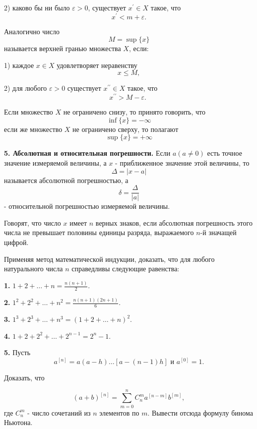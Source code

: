 \documentclass[12pt]{book}
\begin{document}
2) каково бы ни было $\varepsilon>0$, существует $x^{\prime} \in X$ такое, что
$$
x^{\prime}<m+\varepsilon .
$$

\pagestyle{fancy}
\fancyhead{}
\fancyhead[RO]{\thepage}

Аналогично число
$$
M=\sup \{x\}
$$
называется верхней гранью множества $X$, если:

1) каждое $x \in X$ удовлетворяет неравенству
$$
x \leqslant M,
$$

2) для любого $\varepsilon>0$ существует $x^{\prime \prime} \in X$ такое, что
$$
x^{\prime \prime}>M-\varepsilon \text {. }
$$

Если множество $X$ не ограничено снизу, то принято говорить, что
$$
\inf \{x\}=-\infty
$$
если же множество $X$ не ограничено сверху, то полагают
$$
\sup \{x\}=+\infty
$$

\textbf{5. Абсолютная и относительная погрешности.} Если $a(a \neq 0)$ есть точное значение измеряемой величины, а $x$ - приближенное значение этой величины, то
$$
\Delta=|x-a|
$$
называется абсолютной погрешностью, а
$$
\delta=\frac{\Delta}{|a|}
$$
- относительной погрешностью измеряемой величины.

Говорят, что число $x$ имеет $n$ верных знаков, если абсолютная погрешность этого числа не превышает половины единицы разряда, выражаемого $n$-й значащей цифрой.

Применяя метод математической индукции, доказать, что для любого натурального числа $n$ справедливы следующие равенства:

\textbf{1.} $1+2+\ldots+n=\frac{n(n+1)}{2}$.

\textbf{2.} $1^2+2^2+\ldots+n^2=\frac{n(n+1)(2 n+1)}{6}$.

\textbf{3.} $1^3+2^3+\ldots+n^3=(1+2+\ldots+n)^2$.

\textbf{4.} $1+2+2^2+\ldots+2^{n-1}=2^n-1$.

\textbf{5.} Пусть
$$
a^{[n]}=a(a-h) \ldots[a-(n-1) h] \text { и } a^{[0]}=1 .
$$

Доказать, что

$$
(a+b)^{[n]}=\sum_{m=0}^n C_n^m a^{[n-m]} b^{[m]},
$$
где $C_n^m$ - число сочетаний из $n$ элементов по $m$. Вывести отсюда формулу бинома Ньютона.
\end{document}
